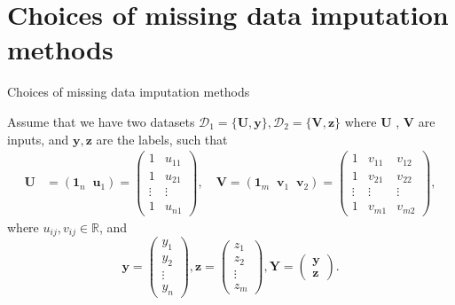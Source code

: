 \documentclass[xcolor={dvipsnames}]{beamer} %
\begin{document}
\section{Choices of missing data imputation methods}
\begin{frame}{Choices of missing data imputation methods}
    \begin{theo}
Assume that we have two datasets $\mathcal{D}_1 = \{\mathbf{U}, \mathbf{y}\}, \mathcal{D}_2 = \{\mathbf{V}, \boldsymbol{z}\}$ where $\mathbf{U}$ 
, $\mathbf{V}$
are inputs, and $\mathbf{y}, \boldsymbol{z}$ are the labels, such that
\begin{align}
    \mathbf{U} &= (\mathbf{1}_n \; \;\mathbf{u}_1)  = \begin{pmatrix}
        1 & u_{11}\\
        1 & u_{21}\\
        \vdots &\vdots\\
        1 & u_{n1}
    \end{pmatrix},\quad
    \mathbf{V} = (\mathbf{1}_m \; \;\mathbf{v}_1 \; \;\mathbf{v}_2)  = \begin{pmatrix}
        1 & v_{11} & v_{12}\\
        1 & v_{21} & v_{22} \\
        \vdots &\vdots & \vdots\\
        1 & v_{m1} & v_{m2}
    \end{pmatrix},    
\end{align}
where $u_{ij}, v_{ij}\in \mathbb{R}$, and 
\begin{equation}
    \mathbf{y}=\begin{pmatrix}
        y_1\\y_2\\\vdots\\y_n
    \end{pmatrix}, \boldsymbol{z}=\begin{pmatrix}
        z_1\\z_2\\\vdots\\z_m
    \end{pmatrix}, \mathbf{Y} = \begin{pmatrix}
        \mathbf{y}\\\boldsymbol{z} 
    \end{pmatrix}.
\end{equation}
\end{theo}
\end{frame}
\end{document}
